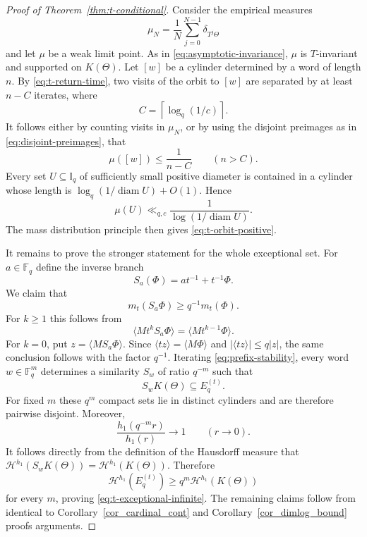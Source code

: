 \documentclass[11pt]{article}
\theoremstyle{remark}
\newcommand{\Haus}{\mathcal{H}}
\newcommand{\Iq}{\mathbb{I}_q}
\newcommand{\Et}{E_q^{(t)}}
\newcommand{\mt}{m_t}
\begin{document}
\begin{proof}[Proof of Theorem~\ref{thm:t-conditional}]
Consider the empirical measures
\[
 \mu_N=\frac1N\sum_{j=0}^{N-1}\delta_{T^j\Theta}
\]
and let $\mu$ be a weak limit point.  As in
\eqref{eq:asymptotic-invariance}, $\mu$ is $T$-invariant and
supported on $K(\Theta)$.  Let $[w]$ be a cylinder determined by a
word of length $n$. By \eqref{eq:t-return-time}, two visits of the
orbit to $[w]$ are separated by at least $n-C$ iterates, where
\begin{equation} \label{eq:t-return-constant}
 C=\left\lceil\log_q(1/c)\right\rceil.
\end{equation}
It follows either by counting visits in $\mu_N$, or by using the
disjoint preimages as in \eqref{eq:disjoint-preimages}, that
\begin{equation} \label{eq:t-cylinder-measure}
 \mu([w])\leq\frac1{n-C}\qquad(n>C).
\end{equation}
Every set $U\subseteq\Iq$ of sufficiently small positive diameter is
contained in a cylinder whose length is
$\log_q(1/\operatorname{diam}U)+O(1)$.  Hence
\begin{equation} \label{eq:t-frostman}
 \mu(U)\ll_{q,c}\frac1{\log(1/\operatorname{diam}U)}.
\end{equation}
The mass distribution principle then gives
\eqref{eq:t-orbit-positive}.

It remains to prove the stronger statement for the whole exceptional
set. For $a\in\mathbb F_q$ define the inverse branch
\begin{equation} \label{eq:inverse-branch}
 S_a(\Phi)=at^{-1}+t^{-1}\Phi.
\end{equation}
We claim that
\begin{equation} \label{eq:prefix-stability}
 \mt(S_a\Phi)\geq q^{-1}\mt(\Phi).
\end{equation}
For $k\geq1$ this follows from
\[
 \langle Mt^kS_a\Phi\rangle
 =\langle Mt^{k-1}\Phi\rangle.
\]
For $k=0$, put $z=\langle MS_a\Phi\rangle$.  Since $\langle
tz\rangle=\langle M\Phi\rangle$ and $|\langle tz\rangle|\leq q|z|$,
the same conclusion follows with the factor $q^{-1}$.  Iterating
\eqref{eq:prefix-stability}, every word $w\in\mathbb F_q^m$
determines a similarity $S_w$ of ratio $q^{-m}$ such that
\begin{equation} \label{eq:prefixed-copies}
 S_wK(\Theta)\subseteq\Et.
\end{equation}
For fixed $m$ these $q^m$ compact sets lie in distinct cylinders and
are therefore pairwise disjoint.  Moreover,
\begin{equation} \label{eq:slow-variation-h1}
 \frac{h_1(q^{-m}r)}{h_1(r)}\longrightarrow1
 \qquad(r\to0).
\end{equation}
It follows directly from the definition of the Hausdorff measure
that $\Haus^{h_1}(S_wK(\Theta))=\Haus^{h_1}(K(\Theta))$.  Therefore
\[
 \Haus^{h_1}(\Et)
 \geq q^m\Haus^{h_1}(K(\Theta))
\]
for every $m$, proving \eqref{eq:t-exceptional-infinite}.  The
remaining claims follow from identical to
Corollary~\ref{cor_cardinal_cont} and
Corollary~\ref{cor_dimlog_bound} proofs arguments.
\end{proof}
\end{document}
